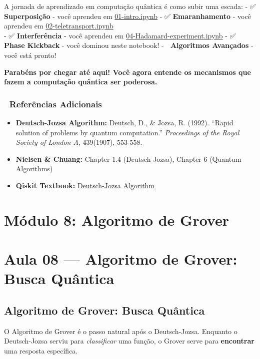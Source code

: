 \documentclass[
  brazilian,
]{report}
\providecommand{\tightlist}{%
  \setlength{\itemsep}{0pt}\setlength{\parskip}{0pt}}
\begin{document}
A jornada de aprendizado em computação quântica é como subir uma escada:
- ✅ \textbf{Superposição} - você aprendeu em \url{01-intro.ipynb} - ✅
\textbf{Emaranhamento} - você aprendeu em \url{02-teletransport.ipynb}\\
- ✅ \textbf{Interferência} - você aprendeu em
\url{04-Hadamard-experiment.ipynb} - ✅ \textbf{Phase Kickback} - você
dominou neste notebook! - 🚀 \textbf{Algoritmos Avançados} - você está
pronto!

\textbf{Parabéns por chegar até aqui! Você agora entende os mecanismos
que fazem a computação quântica ser poderosa.} 🎉

\subsection{📖 Referências Adicionais}\label{referuxeancias-adicionais}

\begin{itemize}
\tightlist
\item
  \textbf{Deutsch-Jozsa Algorithm:} Deutsch, D., \& Jozsa, R. (1992).
  ``Rapid solution of problems by quantum computation.''
  \emph{Proceedings of the Royal Society of London A}, 439(1907),
  553-558.
\item
  \textbf{Nielsen \& Chuang:} Chapter 1.4 (Deutsch-Jozsa), Chapter 6
  (Quantum Algorithms)
\item
  \textbf{Qiskit Textbook:}
  \href{https://qiskit.org/textbook/ch-algorithms/deutsch-jozsa.html}{Deutsch-Jozsa
  Algorithm}
\end{itemize}

\newpage

\chapter{Módulo 8: Algoritmo de
Grover}\label{muxf3dulo-8-algoritmo-de-grover}

\chapter{Aula 08 --- Algoritmo de Grover: Busca
Quântica}\label{aula-08-algoritmo-de-grover-busca-quuxe2ntica}

\section{Algoritmo de Grover: Busca
Quântica}\label{algoritmo-de-grover-busca-quuxe2ntica}

O Algoritmo de Grover é o passo natural após o Deutsch-Jozsa. Enquanto o
Deutsch-Jozsa serviu para \emph{classificar} uma função, o Grover serve
para \textbf{encontrar} uma resposta específica.
\end{document}
